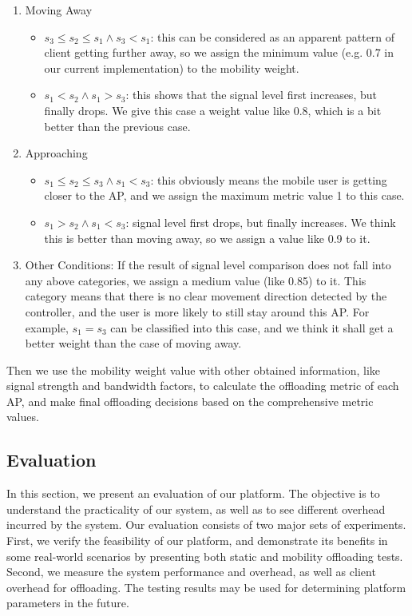 \documentclass[english]{tktltiki}
\begin{document}
\begin{enumerate}
  \item Moving Away
  \begin{itemize}
    \item $s_3 \leq s_2 \leq s_1 \land s_3 < s_1$: this can be considered as an apparent pattern of client getting further away, so we assign the minimum value (e.g. 0.7 in our current implementation) to the mobility weight.
    \item $s_1 < s_2 \land s_1 > s_3 $: this shows that the signal level first increases, but finally drops. We give this case a weight value like 0.8, which is a bit better than the previous case.
  \end{itemize}  
  
  \item Approaching
  \begin{itemize}
    \item $s_1 \leq s_2 \leq s_3 \land s_1 < s_3$: this obviously means the mobile user is getting closer to the AP, and we assign the maximum metric value 1 to this case.
    \item $s_1 > s_2 \land s_1 < s_3 $: signal level first drops, but finally increases. We think this is better than moving away, so we assign a value like 0.9 to it. 
  \end{itemize}
  \item Other Conditions: If the result of signal level comparison does not fall into any above categories, we assign a medium value (like 0.85) to it. This category means that there is no clear movement direction detected by the controller, and the user is more likely to still stay around this AP. For example, $s_1 = s_3$ can be classified into this case, and we think it shall get a better weight than the case of moving away. 
\end{enumerate}

Then we use the mobility weight value with other obtained information, like signal strength and bandwidth factors, to calculate the offloading metric of each AP, and make final offloading decisions based on the comprehensive metric values.


\subsection{Evaluation}

In this section, we present an evaluation of our platform. The objective is to understand the practicality of our system, as well as to see different overhead incurred by the system. Our evaluation consists of two major sets of experiments. First, we verify the feasibility of our platform, and demonstrate its benefits in some real-world scenarios by presenting both static and mobility offloading tests. Second, we measure the system performance and overhead, as well as client overhead for offloading. The testing results may be used for determining platform parameters in the future.
\end{document}
